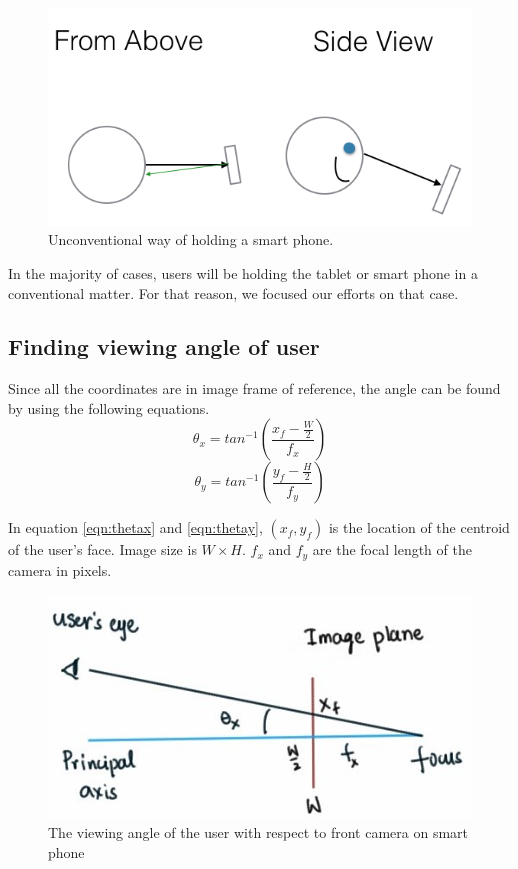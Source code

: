 \documentclass[12pt,twocolumn,letterpaper]{article}
\begin{document}
\begin{figure}[!htbp]
\centering
\includegraphics[height=30 mm]{images/unconventional.png}
\caption{Unconventional way of holding a smart phone.}
\label{fig:unconventional}
\end{figure}

In the majority of cases, users will be holding the tablet or smart phone in a conventional matter.  For that reason, we focused our efforts on that case.

\subsection{Finding viewing angle of user}
Since all the coordinates are in image frame of reference, the angle can be found by using the following equations. 
\begin{equation}
\theta_x = tan^{-1} \left( \frac{x_f - \frac{W}{2}}{f_x} \right)
\label{eqn:thetax}
\end{equation}
\begin{equation}
\theta_y = tan^{-1} \left( \frac{y_f - \frac{H}{2}}{f_y} \right)
\label{eqn:thetay}
\end{equation}

In equation \ref{eqn:thetax} and \ref{eqn:thetay}, $(x_f, y_f)$ is the location of the centroid of the user's face. Image size is $W \times H$. $f_x$ and $f_y$ are the focal length of the camera in pixels.

\begin{figure}[!htbp]
\includegraphics[scale=0.5]{images/view_angle}
\caption{The viewing angle of the user with respect to front camera on smart phone}
\label{fig:viewangle}
\end{figure}
\end{document}
